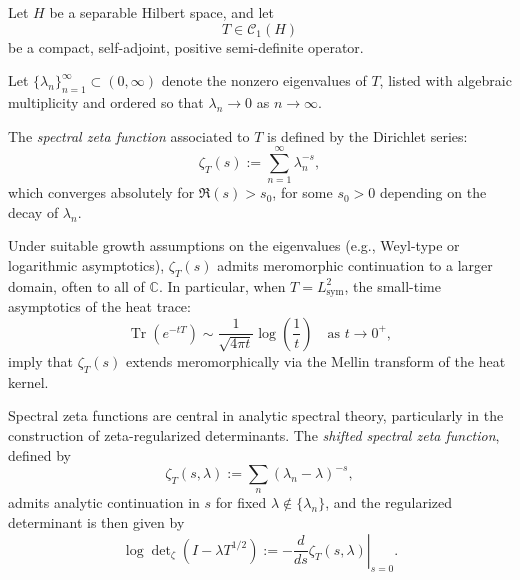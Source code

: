 \begin{definition}
\label{def:spectral-zeta-function}

Let \( H \) be a separable Hilbert space, and let
\[
T \in \mathcal{C}_1(H)
\]
be a compact, self-adjoint, positive semi-definite operator.

Let \( \{ \lambda_n \}_{n=1}^\infty \subset (0,\infty) \) denote the nonzero eigenvalues of \( T \), listed with algebraic multiplicity and ordered so that \( \lambda_n \to 0 \) as \( n \to \infty \).

\medskip

The \emph{spectral zeta function} associated to \( T \) is defined by the Dirichlet series:
\[
\zeta_T(s) := \sum_{n=1}^\infty \lambda_n^{-s},
\]
which converges absolutely for \( \Re(s) > s_0 \), for some \( s_0 > 0 \) depending on the decay of \( \lambda_n \).

\medskip

Under suitable growth assumptions on the eigenvalues (e.g., Weyl-type or logarithmic asymptotics), \( \zeta_T(s) \) admits meromorphic continuation to a larger domain, often to all of \( \mathbb{C} \). In particular, when \( T = L_{\mathrm{sym}}^2 \), the small-time asymptotics of the heat trace:
\[
\operatorname{Tr}(e^{-t T}) \sim \frac{1}{\sqrt{4\pi t}} \log\left( \frac{1}{t} \right)
\quad \text{as } t \to 0^+,
\]
imply that \( \zeta_T(s) \) extends meromorphically via the Mellin transform of the heat kernel.

\medskip

Spectral zeta functions are central in analytic spectral theory, particularly in the construction of zeta-regularized determinants. The \emph{shifted spectral zeta function}, defined by
\[
\zeta_T(s, \lambda) := \sum_n (\lambda_n - \lambda)^{-s},
\]
admits analytic continuation in \( s \) for fixed \( \lambda \notin \{\lambda_n\} \), and the regularized determinant is then given by
\[
\log \det\nolimits_\zeta(I - \lambda T^{1/2}) := -\left.\frac{d}{ds} \zeta_T(s, \lambda)\right|_{s = 0}.
\]
\end{definition}
% 